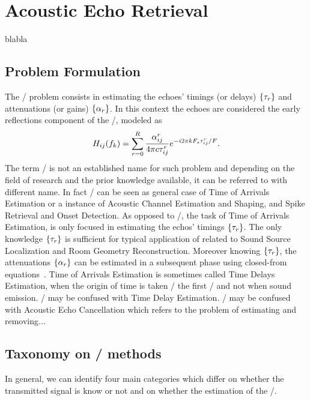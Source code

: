 \chapter{Acoustic Echo Retrieval}\label{chap:estimation}
\vspace{-2.5em}
  blabla

\section{Problem Formulation}
The \AERdef/ problem consists in estimating the echoes' timings (or delays) $\kbrace{\tau_r}$ and attenuations (or gains) $\kbrace{\alpha_r}$.
In this context the echoes are considered the early reflections component of the \RIR/, modeled as
\begin{equation}
     H_{ij}(f_k) = \sum_{r=0}^{R} \frac{\alpha_{ij}^r}{4 \pi c \tau_{ij}^r} {e}^{- {i} 2 \pi k F_s \tau_{ij}^r / F}
    .
\end{equation}
The term \AER/ is not an established name for such problem and depending on the field of research and the prior knowledge available, it can be referred to with different name.
In fact \AER/ can be seen as general case of Time of Arrivals Estimation or a instance of Acoustic Channel Estimation and Shaping, and Spike Retrieval and Onset Detection.
As opposed to \AER/, the task of Time of Arrivals Estimation, is only focused in estimating the echos' timings $\kbrace{\tau_r}$.
The only knowledge $\kbrace{\tau_r}$ is sufficient for typical application of related to Sound Source Localization and Room Geometry Reconstruction.
Moreover knowing $\kbrace{\tau_r}$, the attenuations $\kbrace{\alpha_r}$ can be estimated in a subsequent phase using closed-from equations~.
Time of Arrivals Estimation is sometimes called Time Delays Estimation, when the origin of time is taken \wrt/ the first \TOA/ and not when sound emission.
\AER/ may be confused with Time Delay Estimation.
\AER/ may be confused with Acoustic Echo Cancellation which refers to the problem of estimating and removing...

\section{Taxonomy on \AER/ methods}

In general, we can identify four main categories which differ on whether the transmitted signal is know or not and on whether the estimation of the \RIR/.

